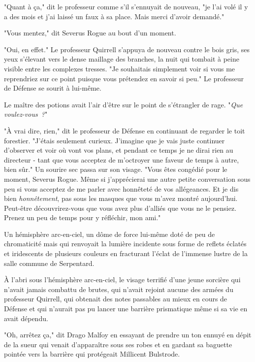 "Quant à ça," dit le professeur comme s'il s'ennuyait de nouveau, "je l'ai volé il y a des mois et j'ai laissé un faux à sa place. Mais merci d'avoir demandé."

"Vous mentez," dit Severus Rogue au bout d'un moment.

"Oui, en effet." Le professeur Quirrell s'appuya de nouveau contre le bois gris, ses yeux s'élevant vers le dense maillage des branches, la nuit qui tombait à peine visible entre les complexes tresses. "Je souhaitais simplement voir si vous me reprendriez sur ce point puisque vous prétendez en savoir si peu." Le professeur de Défense se sourit à lui-même.

Le maître des potions avait l'air d'être sur le point de s'étrangler de rage. "\emph{Que voulez-vous~?}"

"À vrai dire, rien," dit le professeur de Défense en continuant de regarder le toit forestier. "J'étais seulement curieux. J'imagine que je vais juste continuer d'observer et voir où vont vos plans, et pendant ce temps je ne dirai rien au directeur - tant que vous acceptez de m'octroyer une faveur de temps à autre, bien sûr." Un sourire sec passa sur son visage. "Vous êtes congédié pour le moment, Severus Rogue. Même si j'apprécierai une autre petite conversation sous peu si vous acceptez de me parler avec honnêteté de vos allégeances. Et je dis bien \emph{honnêtement}, pas sous les masques que vous m'avez montré aujourd'hui. Peut-être découvrirez-vous que vous avez plus d'alliés que vous ne le pensiez. Prenez un peu de temps pour y réfléchir, mon ami."


Un hémisphère arc-en-ciel, un dôme de force lui-même doté de peu de chromaticité mais qui renvoyait la lumière incidente sous forme de reflets éclatés et iridescents de plusieurs couleurs en fracturant l'éclat de l'immense lustre de la salle commune de Serpentard.

À l'abri sous l'hémisphère arc-en-ciel, le visage terrifié d'une jeune sorcière qui n'avait jamais combattu de brutes, qui n'avait rejoint aucune des armées du professeur Quirrell, qui obtenait des notes passables au mieux en cours de Défense et qui n'aurait pas pu lancer une barrière prismatique même si sa vie en avait dépendu.

"Oh, arrêtez ça," dit Drago Malfoy en essayant de prendre un ton ennuyé en dépit de la sueur qui venait d'apparaître sous ses robes et en gardant sa baguette pointée vers la barrière qui protégeait Millicent Bulstrode.

